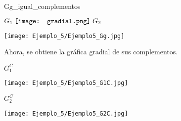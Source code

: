 \documentclass[fleqn, 11pt]{beamer}
\newcommand{\gradial}{\hspace{0.9mm} \texttt{[image: gradial.png]} \hspace{1mm}}
\begin{document}
\begin{ejemplo}[breakable, pad at break = 4mm, beforeafter skip = 4mm]{}{Gg_igual_complementos}
\begin{center}
\begin{minipage}[h]{0.25\linewidth}
                $ G_1 \gradial G_2 $

                \texttt{[image: Ejemplo\_5/Ejemplo5\_Gg.jpg]}
            \end{minipage}
        \end{center} \vspace{3mm}

        Ahora, se obtiene la gráfica gradial de sus complementos. \vspace{2mm}

        \begin{center}
            \begin{minipage}[h]{0.6\linewidth}
                \begin{minipage}[h]{0.45\linewidth}
                    $ G_1^C $

                    \texttt{[image: Ejemplo\_5/Ejemplo5\_G1C.jpg]}
                \end{minipage} 
                \begin{minipage}[h]{0.45\linewidth}
                    $ G_2^C $

                    \texttt{[image: Ejemplo\_5/Ejemplo5\_G2C.jpg]}
                \end{minipage} 
    

\end{minipage}
\end{center}
\end{ejemplo}
\end{document}
